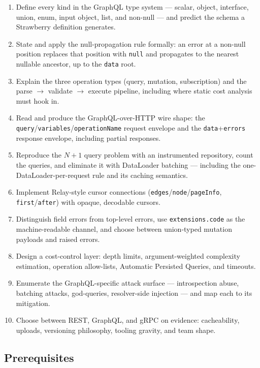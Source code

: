 \begin{enumerate}[label=\textbf{LO-\arabic*.}]
  \item Define every kind in the GraphQL type system --- scalar, object,
        interface, union, enum, input object, list, and non-null --- and
        predict the schema a Strawberry definition generates.
  \item State and apply the null-propagation rule formally: an error at a
        non-null position replaces that position with \texttt{null} and
        propagates to the nearest nullable ancestor, up to the
        \texttt{data} root.
  \item Explain the three operation types (query, mutation, subscription)
        and the parse $\to$ validate $\to$ execute pipeline, including
        where static cost analysis must hook in.
  \item Read and produce the GraphQL-over-HTTP wire shape: the
        \texttt{query}/\texttt{variables}/\texttt{operationName} request
        envelope and the \texttt{data}+\texttt{errors} response envelope,
        including partial responses.
  \item Reproduce the $N{+}1$ query problem with an instrumented
        repository, count the queries, and eliminate it with DataLoader
        batching --- including the one-DataLoader-per-request rule and its
        caching semantics.
  \item Implement Relay-style cursor connections
        (\texttt{edges}/\texttt{node}/\texttt{pageInfo},
        \texttt{first}/\texttt{after}) with opaque, decodable cursors.
  \item Distinguish field errors from top-level errors, use
        \texttt{extensions.code} as the machine-readable channel, and
        choose between union-typed mutation payloads and raised errors.
  \item Design a cost-control layer: depth limits, argument-weighted
        complexity estimation, operation allow-lists, Automatic Persisted
        Queries, and timeouts.
  \item Enumerate the GraphQL-specific attack surface --- introspection
        abuse, batching attacks, god-queries, resolver-side injection ---
        and map each to its mitigation.
  \item Choose between REST, GraphQL, and gRPC on evidence: cacheability,
        uploads, versioning philosophy, tooling gravity, and team shape.
\end{enumerate}

\subsection{Prerequisites}

